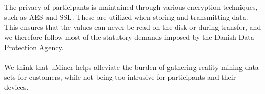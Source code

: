 \\\\
The privacy of participants is maintained through various encryption techniques, such as AES and SSL. These are utilized when storing and transmitting data. This ensures that the values can never be read on the disk or during transfer, and we therefore follow most of the statutory demands imposed by the Danish Data Protection Agency. 
\\\\
We think that uMiner helps alleviate the burden of gathering reality mining data sets for customers, while not being too intrusive for participants and their devices.




